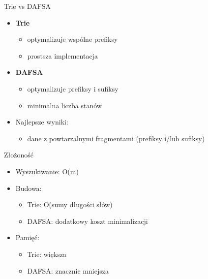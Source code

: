 \documentclass{beamer}
\begin{document}
\begin{frame}{Trie vs DAFSA}
    \begin{itemize}
        \item \textbf{Trie}
              \begin{itemize}
                  \item optymalizuje wspólne prefiksy
                  \item prostsza implementacja
              \end{itemize}

        \item \textbf{DAFSA}
              \begin{itemize}
                  \item optymalizuje prefiksy i sufiksy
                  \item minimalna liczba stanów
              \end{itemize}

              \vspace{0.5cm}

        \item Najlepsze wyniki:
              \begin{itemize}
                  \item dane z powtarzalnymi fragmentami (prefiksy i/lub sufiksy)
              \end{itemize}
    \end{itemize}
\end{frame}


\begin{frame}{Złożoność}
    \begin{itemize}
        \item Wyszukiwanie: O(m)
        \item Budowa:
              \begin{itemize}
                  \item Trie: O(sumy długości słów)
                  \item DAFSA: dodatkowy koszt minimalizacji
              \end{itemize}

        \item Pamięć:
              \begin{itemize}
                  \item Trie: większa
                  \item DAFSA: znacznie mniejsza
              \end{itemize}
    \end{itemize}
\end{frame}
\end{document}
